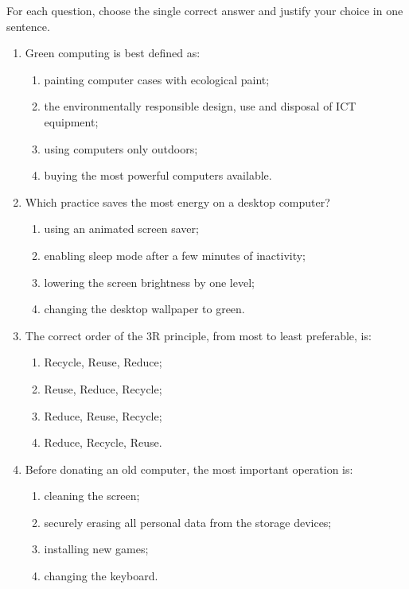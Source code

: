 \documentclass[11pt]{article}
\begin{document}
\begin{exercice}
For each question, choose the single correct answer and justify your choice in one sentence.
\begin{enumerate}
\item Green computing is best defined as:
\begin{enumerate}
\item painting computer cases with ecological paint;
\item the environmentally responsible design, use and disposal of ICT equipment;
\item using computers only outdoors;
\item buying the most powerful computers available.
\end{enumerate}
\item Which practice saves the most energy on a desktop computer?
\begin{enumerate}
\item using an animated screen saver;
\item enabling sleep mode after a few minutes of inactivity;
\item lowering the screen brightness by one level;
\item changing the desktop wallpaper to green.
\end{enumerate}
\item The correct order of the 3R principle, from most to least preferable, is:
\begin{enumerate}
\item Recycle, Reuse, Reduce;
\item Reuse, Reduce, Recycle;
\item Reduce, Reuse, Recycle;
\item Reduce, Recycle, Reuse.
\end{enumerate}
\item Before donating an old computer, the most important operation is:
\begin{enumerate}
\item cleaning the screen;
\item securely erasing all personal data from the storage devices;
\item installing new games;
\item changing the keyboard.
\end{enumerate}
\end{enumerate}
\end{exercice}
\end{document}
